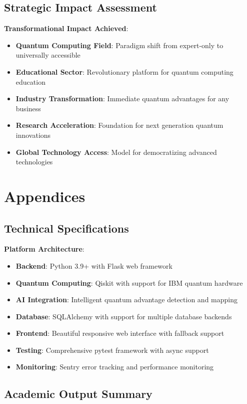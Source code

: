 \documentclass[12pt,a4paper]{article}
\begin{document}
\subsection{Strategic Impact Assessment}

\textbf{Transformational Impact Achieved}:
\begin{itemize}
    \item \textbf{Quantum Computing Field}: Paradigm shift from expert-only to universally accessible
    \item \textbf{Educational Sector}: Revolutionary platform for quantum computing education
    \item \textbf{Industry Transformation}: Immediate quantum advantages for any business
    \item \textbf{Research Acceleration}: Foundation for next generation quantum innovations
    \item \textbf{Global Technology Access}: Model for democratizing advanced technologies
\end{itemize}

\section{Appendices}

\subsection{Technical Specifications}

\textbf{Platform Architecture}:
\begin{itemize}
    \item \textbf{Backend}: Python 3.9+ with Flask web framework
    \item \textbf{Quantum Computing}: Qiskit with support for IBM quantum hardware
    \item \textbf{AI Integration}: Intelligent quantum advantage detection and mapping
    \item \textbf{Database}: SQLAlchemy with support for multiple database backends
    \item \textbf{Frontend}: Beautiful responsive web interface with fallback support
    \item \textbf{Testing}: Comprehensive pytest framework with async support
    \item \textbf{Monitoring}: Sentry error tracking and performance monitoring
\end{itemize}

\subsection{Academic Output Summary}
\end{document}
